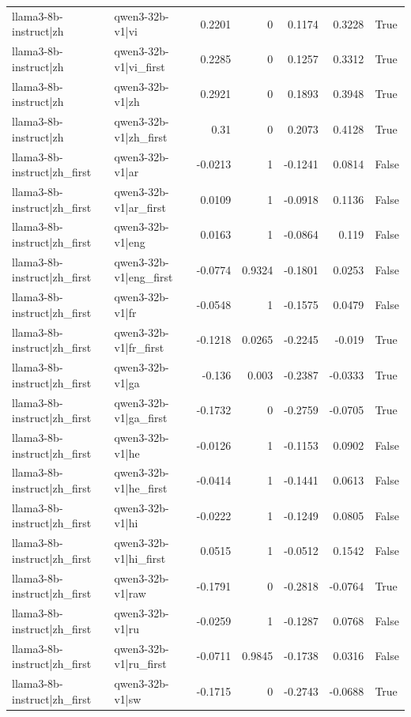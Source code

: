 \begin{table}
\begin{tabular}{l l r r r r l}
llama3-8b-instruct|zh & qwen3-32b-v1|vi & 0.2201 & 0 & 0.1174 & 0.3228 & True \\
llama3-8b-instruct|zh & qwen3-32b-v1|vi_first & 0.2285 & 0 & 0.1257 & 0.3312 & True \\
llama3-8b-instruct|zh & qwen3-32b-v1|zh & 0.2921 & 0 & 0.1893 & 0.3948 & True \\
llama3-8b-instruct|zh & qwen3-32b-v1|zh_first & 0.31 & 0 & 0.2073 & 0.4128 & True \\
llama3-8b-instruct|zh_first & qwen3-32b-v1|ar & -0.0213 & 1 & -0.1241 & 0.0814 & False \\
llama3-8b-instruct|zh_first & qwen3-32b-v1|ar_first & 0.0109 & 1 & -0.0918 & 0.1136 & False \\
llama3-8b-instruct|zh_first & qwen3-32b-v1|eng & 0.0163 & 1 & -0.0864 & 0.119 & False \\
llama3-8b-instruct|zh_first & qwen3-32b-v1|eng_first & -0.0774 & 0.9324 & -0.1801 & 0.0253 & False \\
llama3-8b-instruct|zh_first & qwen3-32b-v1|fr & -0.0548 & 1 & -0.1575 & 0.0479 & False \\
llama3-8b-instruct|zh_first & qwen3-32b-v1|fr_first & -0.1218 & 0.0265 & -0.2245 & -0.019 & True \\
llama3-8b-instruct|zh_first & qwen3-32b-v1|ga & -0.136 & 0.003 & -0.2387 & -0.0333 & True \\
llama3-8b-instruct|zh_first & qwen3-32b-v1|ga_first & -0.1732 & 0 & -0.2759 & -0.0705 & True \\
llama3-8b-instruct|zh_first & qwen3-32b-v1|he & -0.0126 & 1 & -0.1153 & 0.0902 & False \\
llama3-8b-instruct|zh_first & qwen3-32b-v1|he_first & -0.0414 & 1 & -0.1441 & 0.0613 & False \\
llama3-8b-instruct|zh_first & qwen3-32b-v1|hi & -0.0222 & 1 & -0.1249 & 0.0805 & False \\
llama3-8b-instruct|zh_first & qwen3-32b-v1|hi_first & 0.0515 & 1 & -0.0512 & 0.1542 & False \\
llama3-8b-instruct|zh_first & qwen3-32b-v1|raw & -0.1791 & 0 & -0.2818 & -0.0764 & True \\
llama3-8b-instruct|zh_first & qwen3-32b-v1|ru & -0.0259 & 1 & -0.1287 & 0.0768 & False \\
llama3-8b-instruct|zh_first & qwen3-32b-v1|ru_first & -0.0711 & 0.9845 & -0.1738 & 0.0316 & False \\
llama3-8b-instruct|zh_first & qwen3-32b-v1|sw & -0.1715 & 0 & -0.2743 & -0.0688 & True \\

\end{tabular}
\end{table}

